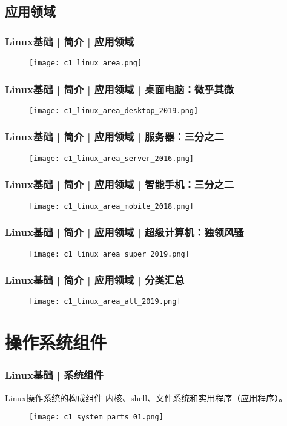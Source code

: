 \subsection{应用领域}
\begin{frame}
  \frametitle{Linux基础 | 简介 | 应用领域}
  \begin{figure}
    \centering
    \texttt{[image: c1\_linux\_area.png]}
  \end{figure}
\end{frame}

\begin{frame}
  \frametitle{Linux基础 | 简介 | 应用领域 | 桌面电脑：微乎其微}
  \begin{figure}
    \centering
    \texttt{[image: c1\_linux\_area\_desktop\_2019.png]}
  \end{figure}
\end{frame}

\begin{frame}
  \frametitle{Linux基础 | 简介 | 应用领域 | 服务器：三分之二}
  \begin{figure}
    \centering
    \texttt{[image: c1\_linux\_area\_server\_2016.png]}
  \end{figure}
\end{frame}

\begin{frame}
  \frametitle{Linux基础 | 简介 | 应用领域 | 智能手机：三分之二}
  \begin{figure}
    \centering
    \texttt{[image: c1\_linux\_area\_mobile\_2018.png]}
  \end{figure}
\end{frame}

\begin{frame}
  \frametitle{Linux基础 | 简介 | 应用领域 | 超级计算机：独领风骚}
  \begin{figure}
    \centering
    \texttt{[image: c1\_linux\_area\_super\_2019.png]}
  \end{figure}
\end{frame}

\begin{frame}
  \frametitle{Linux基础 | 简介 | 应用领域 | 分类汇总}
  \begin{figure}
    \centering
    \texttt{[image: c1\_linux\_area\_all\_2019.png]}
  \end{figure}
\end{frame}

\section{操作系统组件}
\begin{frame}
  \frametitle{Linux基础 | 系统组件}
  \begin{block}{Linux操作系统的\alert{构成组件}}
    内核、shell、文件系统和实用程序（应用程序）。
  \end{block}
  \begin{figure}
    \centering
    \texttt{[image: c1\_system\_parts\_01.png]}
  \end{figure}
\end{frame}

